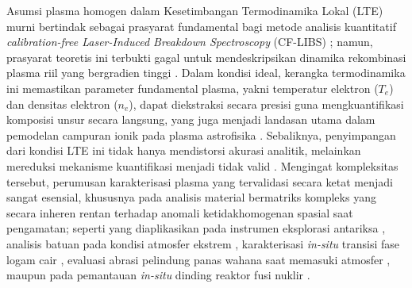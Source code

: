\documentclass[10pt,leqno]{amsart}
\begin{document}
Asumsi plasma homogen dalam Kesetimbangan Termodinamika Lokal (LTE) murni bertindak sebagai prasyarat fundamental bagi metode analisis kuantitatif \textit{calibration-free Laser-Induced Breakdown Spectroscopy} (CF-LIBS) \cite{favre_towards_2025, cristoforetti_local_2010}; namun, prasyarat teoretis ini terbukti gagal untuk mendeskripsikan dinamika rekombinasi plasma riil yang bergradien tinggi \cite{favre_merlin_2025, zaitsev_two-zone_2024}. Dalam kondisi ideal, kerangka termodinamika ini memastikan parameter fundamental plasma, yakni temperatur elektron ($T_e$) dan densitas elektron ($n_e$), dapat diekstraksi secara presisi guna mengkuantifikasi komposisi unsur secara langsung, yang juga menjadi landasan utama dalam pemodelan campuran ionik pada plasma astrofisika \cite{fritzsche_atomic_2025}. Sebaliknya, penyimpangan dari kondisi LTE ini tidak hanya mendistorsi akurasi analitik, melainkan mereduksi mekanisme kuantifikasi menjadi tidak valid \cite{cristoforetti_local_2010, hansen_modeling_2021, zaytsev_accurate_2026}. Mengingat kompleksitas tersebut, perumusan karakterisasi plasma yang tervalidasi secara ketat menjadi sangat esensial, khususnya pada analisis material bermatriks kompleks yang secara inheren rentan terhadap anomali ketidakhomogenan spasial saat pengamatan; seperti yang diaplikasikan pada instrumen eksplorasi antariksa \cite{sawyers_database_2025, manelski_libs_2024}, analisis batuan pada kondisi atmosfer ekstrem \cite{zhang_improving_2025}, karakterisasi \textit{in-situ} transisi fase logam cair \cite{leosson_analysis_2022}, evaluasi abrasi pelindung panas wahana saat memasuki atmosfer \cite{leistikow_quantification_2026}, maupun pada pemantauan \textit{in-situ} dinding reaktor fusi nuklir \cite{marin_roldan_libs_2021}.
\end{document}
